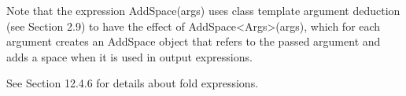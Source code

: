 Note that the expression AddSpace(args) uses class template argument deduction (see Section 2.9) to have the effect of AddSpace<Args>(args), which for each argument creates an AddSpace object that refers to the passed argument and adds a space when it is used in output expressions.

See Section 12.4.6 for details about fold expressions.
































